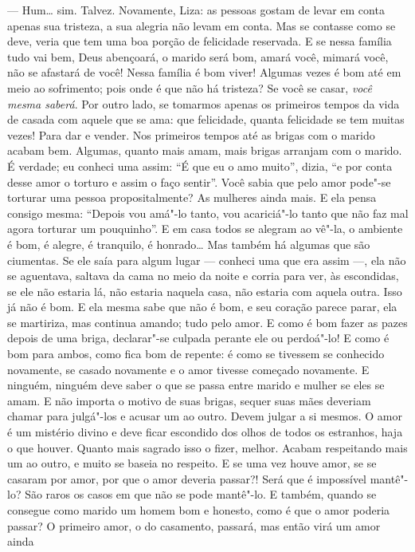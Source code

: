 --- Hum\ldots{} sim. Talvez. Novamente, Liza: as pessoas gostam de levar em
conta apenas sua tristeza, a sua alegria não levam em conta. Mas se
contasse como se deve, veria que tem uma boa porção de felicidade
reservada. E se nessa família tudo vai bem, Deus abençoará, o marido
será bom, amará você, mimará você, não se afastará de você! Nessa
família é bom viver! Algumas vezes é bom até em meio ao sofrimento;
pois onde é que não há tristeza? Se você se casar,
\textit{você mesma saberá}. Por
outro lado, se tomarmos apenas os primeiros tempos da vida de casada
com aquele que se ama: que felicidade, quanta felicidade se tem muitas
vezes! Para dar e vender. Nos primeiros tempos até as brigas com o
marido acabam bem. Algumas, quanto mais amam, mais brigas arranjam com
o marido. É verdade; eu conheci uma assim: ``É que eu o amo muito'',
dizia, ``e por conta desse amor o torturo e assim o faço sentir''. Você
sabia que pelo amor pode"-se torturar uma pessoa propositalmente? As
mulheres ainda mais. E ela pensa consigo mesma: ``Depois vou amá"-lo
tanto, vou acariciá"-lo tanto que não faz mal agora torturar um
pouquinho''. E em casa todos se alegram ao vê"-la, o ambiente é bom, é
alegre, é tranquilo, é honrado\ldots{} Mas também há algumas que são
ciumentas. Se ele saía para algum lugar --- conheci uma que era assim ---,
ela não se aguentava, saltava da cama no meio da noite e corria para
ver, às escondidas, se ele não estaria lá, não estaria naquela casa,
não estaria com aquela outra. Isso já não é bom. E ela mesma sabe que
não é bom, e seu coração parece parar, ela se martiriza, mas continua
amando; tudo pelo amor. E como é bom fazer as pazes depois de uma
briga, declarar"-se culpada perante ele ou perdoá"-lo! E como é bom para
ambos, como fica bom de repente: é como se tivessem se conhecido
novamente, se casado novamente e o amor tivesse começado novamente. E
ninguém, ninguém deve saber o que se passa entre marido e mulher se
eles se amam. E não importa o motivo de suas brigas, sequer suas mães
deveriam chamar para julgá"-los e acusar um ao outro. Devem julgar a si
mesmos. O amor é um mistério divino e deve ficar escondido dos olhos de
todos os estranhos, haja o que houver. Quanto mais sagrado isso o
fizer, melhor. Acabam respeitando mais um ao outro, e muito se baseia
no respeito. E se uma vez houve amor, se se casaram por amor, por que o
amor deveria passar?! Será que é impossível mantê"-lo? São raros os
casos em que não se pode mantê"-lo. E também, quando se consegue como
marido um homem bom e honesto, como é que o amor poderia passar? O
primeiro amor, o do casamento, passará, mas então virá um amor ainda
